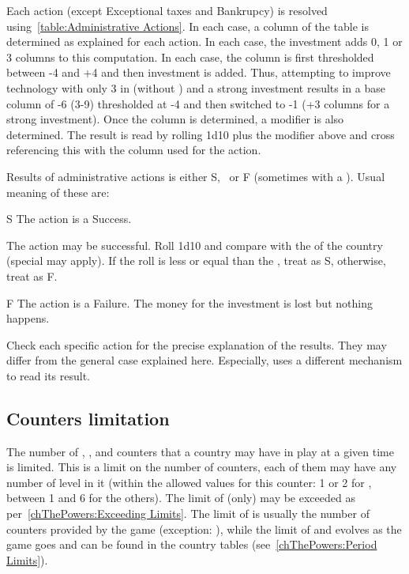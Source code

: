 \aparag Each action (except Exceptional taxes and Bankrupcy) is resolved
using~\ref{table:Administrative Actions}.
\bparag In each case, a column of the table is determined as explained for
each action.
\bparag In each case, the investment adds 0, 1 or 3 columns to this
computation. In each case, the column is first thresholded between -4 and +4
and then investment is added. Thus, attempting to improve technology with only
3 in \MIL (without \MNU) and a strong investment results in a base column of
-6 (3-9) thresholded at -4 and then switched to -1 (+3 columns for a strong
investment).
\bparag Once the column is determined, a modifier is also determined.
\bparag The result is read by rolling 1d10 plus the modifier above and cross
referencing this with the column used for the action.

\aparag Results of administrative actions is either S, \undemi\ or F
(sometimes with a \textetoile).
\bparag Usual meaning of these are:
\begin{modlist}
\item[S] The action is a Success.
\item[\undemi] The action may be successful. Roll 1d10 and compare with the
  \FTI of the country (special \FTI may apply). If the roll is less or equal
  than the \FTI, treat as S, otherwise, treat as F.
\item[F] The action is a Failure. The money for the investment is lost but
  nothing happens.
\end{modlist}
\bparag Check each specific action for the precise explanation of the
results. They may differ from the general case explained here. Especially,
 uses a different mechanism to read its result.





\subsection{Counters limitation}

\aparag The number of \COL, \TP, \MNU and \TradeFLEET counters that a country
may have in play at a given time is limited.
\bparag This is a limit on the number of counters, each of them may have any
number of level in it (within the allowed values for this counter: 1 or 2 for
\MNU, between 1 and 6 for the others).
\bparag The limit of \MNU (only) may be exceeded as
per~\ref{chThePowers:Exceeding Limits}.
\bparag The limit of \TradeFLEET is usually the number of counters provided by
the game (exception: \SUE), while the limit of \COL and \TP evolves as the
game goes and can be found in the country tables (see~\ref{chThePowers:Period
  Limits}).


